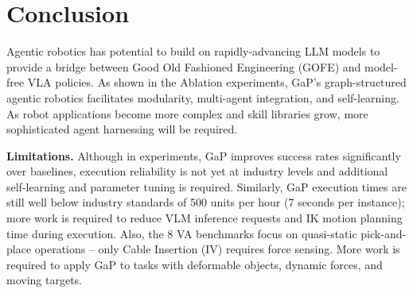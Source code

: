 \section{Conclusion}

Agentic robotics has potential to build on rapidly-advancing LLM models to provide a bridge between Good Old Fashioned Engineering (GOFE) and model-free VLA policies.  As shown in the Ablation experiments, GaP's graph-structured agentic robotics facilitates modularity, multi-agent integration, and self-learning.  As robot applications become more complex and skill libraries grow, more sophisticated agent harnessing will be required.


\textbf{Limitations.} Although in experiments, GaP improves success rates significantly over baselines, execution reliability is not yet at industry levels and additional self-learning and parameter tuning is required.  Similarly, GaP execution times are still well below industry standards of 500 units per hour (7 seconds per instance);  more work is required to reduce VLM inference requests and IK motion planning time during execution.  Also, the 8 VA benchmarks focus on quasi-static pick-and-place operations -- only Cable Insertion (IV) requires force sensing.  More work is required to apply GaP to tasks with deformable objects, dynamic forces, and moving targets.  

